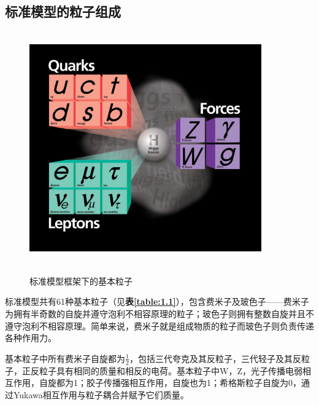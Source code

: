 \subsection{标准模型的粒子组成}
\begin{figure}[H]
 \centering
 \caption{标准模型框架下的基本粒子}
 \includegraphics[height=10cm, width=10cm]{pictures/SM.jpg}
 \label{fig:1.1}
\end{figure}

标准模型共有61种基本粒子（见\textbf{表\ref{table:1.1}}），包含费米子及玻色子——费米子为拥有半奇数的自旋并遵守泡利不相容原理的粒子；玻色子则拥有整数自旋并且不遵守泡利不相容原理。简单来说，费米子就是组成物质的粒子而玻色子则负责传递各种作用力。

基本粒子中所有费米子自旋都为$\frac{1}{2}$，包括三代夸克及其反粒子，三代轻子及其反粒子，正反粒子具有相同的质量和相反的电荷。基本粒子中W，Z，光子传播电弱相互作用，自旋都为1；胶子传播强相互作用，自旋也为1；希格斯粒子自旋为0，通过Yukawa相互作用与粒子耦合并赋予它们质量。

